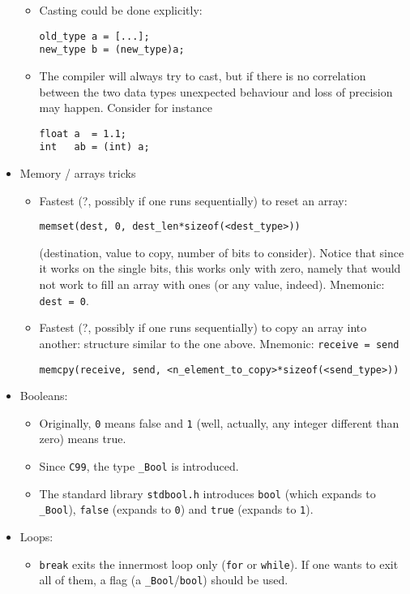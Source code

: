 \documentclass[a4paper,12pt,%
              final%
              ]{article}
\begin{document}
\begin{itemize}
\begin{itemize}
      \item Casting could be done explicitly:
\begin{verbatim}
old_type a = [...];
new_type b = (new_type)a;
\end{verbatim}
      \item The compiler will always try to cast, but if there is no correlation between the two data types unexpected behaviour and loss of precision may happen. Consider for instance
\begin{verbatim}
float a  = 1.1;
int   ab = (int) a;
\end{verbatim}
    \end{itemize}
  \item Memory / arrays tricks
    \begin{itemize}
      \item Fastest (?, possibly if one runs sequentially) to reset an array:
\begin{verbatim}
memset(dest, 0, dest_len*sizeof(<dest_type>))
\end{verbatim}
        (destination, value to copy, number of bits to consider). Notice that since it works on the single bits, this works only with zero, namely that would not work to fill an array with ones (or any value, indeed). Mnemonic: \verb|dest = 0|.
      \item Fastest (?, possibly if one runs sequentially) to copy an array into another: structure similar to the one above. Mnemonic: \verb|receive = send|
\begin{verbatim}
memcpy(receive, send, <n_element_to_copy>*sizeof(<send_type>))
\end{verbatim}
    \end{itemize}
  \item Booleans:
    \begin{itemize}
      \item Originally, \verb|0| means false and \verb|1| (well, actually, any integer different than zero) means true.
      \item Since \verb|C99|, the type \verb|_Bool| is introduced.
      \item The standard library \verb|stdbool.h| introduces \verb|bool| (which expands to \verb|_Bool|), \verb|false| (expands to \verb|0|) and \verb|true| (expands to \verb|1|).
    \end{itemize}
  \item Loops:
    \begin{itemize}
      \item \texttt{break} exits the innermost loop only (\texttt{for} or \texttt{while}). If one wants to exit all of them, a flag (a \verb|_Bool|/\verb|bool|) should be used.

\end{itemize}
\end{itemize}
\end{document}
